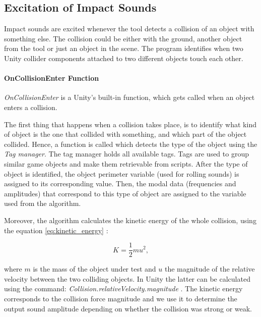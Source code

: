 \subsection{Excitation of Impact Sounds}\label{sec:coll_enter}
Impact sounds are excited whenever the tool detects a collision of an object with something else. The collision could be either with the ground, another object from the tool or just an object in the scene. The program identifies when two Unity\textsuperscript{\textregistered} collider components attached to two different objects touch each other.

\paragraph{OnCollisionEnter Function}
\hfill \break

\textit{OnCollisionEnter} \cite{bib:unity_doc} is a Unity\textsuperscript{\textregistered}'s built-in function, which gets called when an object enters a collision.

The first thing that happens when a collision takes place, is to identify what kind of object is the one that collided with something, and which part of the object collided. Hence, a function is called which detects the type of the object using the \textit{Tag manager}. The tag manager holds all available tags. Tags are used to group similar game objects and make them retrievable from scripts. After the type of object is identified, the object perimeter variable (used for rolling sounds) is assigned to its corresponding value. Then, the modal data (frequencies and amplitudes) that correspond to this type of object are assigned to the variable used from the algorithm.

Moreover, the algorithm calculates the kinetic energy of the whole collision, using the equation \ref{eq:kinetic_energy} \cite{crowell2003conservation}: 

\begin{equation}\label{eq:kinetic_energy}
K = \frac{1}{2} m u^2,
\end{equation}

\noindent where $m$ is the mass of the object under test and $u$ the magnitude of the relative velocity between the two colliding objects. In Unity\textsuperscript{\textregistered} the latter can be calculated using the command: \textit{Collision.relativeVelocity.magnitude} \cite{bib:unity_doc}. The kinetic energy corresponds to the collision force magnitude and we use it to determine the output sound amplitude depending on whether the collision was strong or weak.

